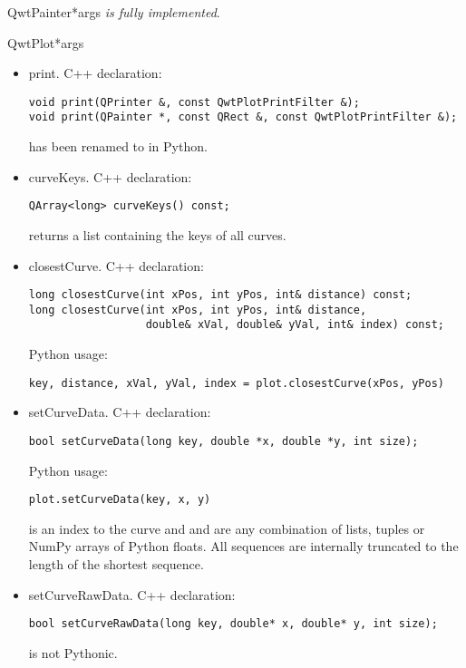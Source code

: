 \documentclass{manual}
\begin{document}
\begin{classdesc}{QwtPainter}{*args}
\emph{is fully implemented}.
\end{classdesc}

\begin{classdesc}{QwtPlot}{*args}

  \begin{itemize}

    \item{print}. C++ declaration:
      \begin{verbatim}
void print(QPrinter &, const QwtPlotPrintFilter &);
void print(QPainter *, const QRect &, const QwtPlotPrintFilter &);
      \end{verbatim}
       has been renamed to  in Python.

    \item{curveKeys}. C++ declaration:
      \begin{verbatim}
QArray<long> curveKeys() const;
      \end{verbatim}
       returns a list containing the keys of all curves.

    \item{closestCurve}. C++ declaration:
      \begin{verbatim}
long closestCurve(int xPos, int yPos, int& distance) const;
long closestCurve(int xPos, int yPos, int& distance,
                  double& xVal, double& yVal, int& index) const;
      \end{verbatim}
      Python usage:
      \begin{verbatim}
key, distance, xVal, yVal, index = plot.closestCurve(xPos, yPos)
      \end{verbatim}

    \item{setCurveData}. C++ declaration:
      \begin{verbatim}
bool setCurveData(long key, double *x, double *y, int size);
      \end{verbatim}
      Python usage:
      \begin{verbatim}
plot.setCurveData(key, x, y)
      \end{verbatim}
       is an index to the curve and  and  are any
      combination of lists, tuples or NumPy arrays of Python floats.
      All sequences are internally truncated to the length of the shortest
      sequence.

    \item{setCurveRawData}. C++ declaration:
      \begin{verbatim}
bool setCurveRawData(long key, double* x, double* y, int size);
      \end{verbatim}
       is not Pythonic.


\end{itemize}
\end{classdesc}
\end{document}
